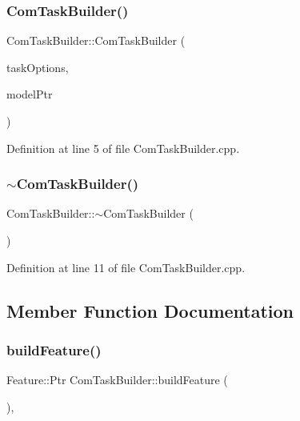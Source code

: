\subsubsection{\texorpdfstring{Com\+Task\+Builder()}{ComTaskBuilder()}}
{\footnotesize\ttfamily Com\+Task\+Builder\+::\+Com\+Task\+Builder (\begin{DoxyParamCaption}\item[{const \hyperlink{classocra_1_1TaskBuilderOptions}{Task\+Builder\+Options} \&}]{task\+Options,  }\item[{Model\+::\+Ptr}]{model\+Ptr }\end{DoxyParamCaption})}



Definition at line 5 of file Com\+Task\+Builder.\+cpp.

\hypertarget{classocra_1_1ComTaskBuilder_a17a4747e20d9e37f734a9f27820d068d}{}\label{classocra_1_1ComTaskBuilder_a17a4747e20d9e37f734a9f27820d068d} 
\subsubsection{\texorpdfstring{$\sim$\+Com\+Task\+Builder()}{~ComTaskBuilder()}}
{\footnotesize\ttfamily Com\+Task\+Builder\+::$\sim$\+Com\+Task\+Builder (\begin{DoxyParamCaption}{ }\end{DoxyParamCaption})\hspace{0.3cm}{\ttfamily [virtual]}}



Definition at line 11 of file Com\+Task\+Builder.\+cpp.



\subsection{Member Function Documentation}
\hypertarget{classocra_1_1ComTaskBuilder_aa4e0d21159da91788a1d2806ddca84da}{}\label{classocra_1_1ComTaskBuilder_aa4e0d21159da91788a1d2806ddca84da} 
\subsubsection{\texorpdfstring{build\+Feature()}{buildFeature()}}
{\footnotesize\ttfamily Feature\+::\+Ptr Com\+Task\+Builder\+::build\+Feature (\begin{DoxyParamCaption}{ }\end{DoxyParamCaption})\hspace{0.3cm}{\ttfamily [protected]}, {\ttfamily [virtual]}}



